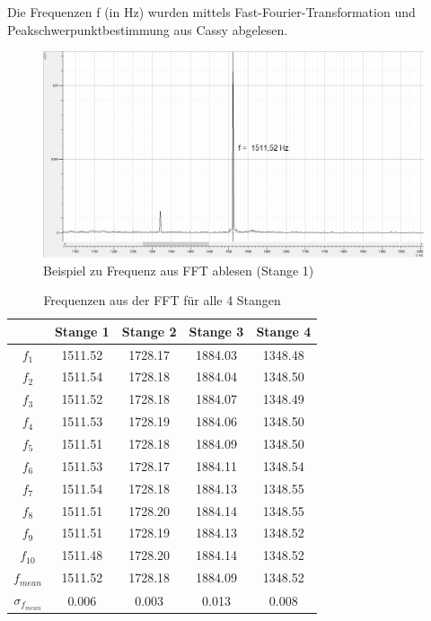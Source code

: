 \documentclass[12pt,a4paper]{article}
\begin{document}
Die Frequenzen f (in Hz) wurden mittels Fast-Fourier-Transformation und Peakschwerpunktbestimmung aus Cassy abgelesen.

\begin{figure}[H]
\centering
\includegraphics[scale=0.43]{Bilder/Beispiel_Cassy_Cu.png}
\caption{Beispiel zu Frequenz aus FFT ablesen (Stange 1)}
\end{figure}

\begin{table}[H]\centering
\caption{Frequenzen aus der FFT für alle 4 Stangen}
\begin{tabular}{c|cccc}
 & Stange 1 & Stange 2 & Stange 3 & Stange 4 \\ 
 \hline
$f_1$ & 1511.52 & 1728.17 & 1884.03 & 1348.48 \\ 
$f_2$ & 1511.54 & 1728.18 & 1884.04 & 1348.50 \\ 
$f_3$ & 1511.52 & 1728.18 & 1884.07 & 1348.49 \\ 
$f_4$ & 1511.53 & 1728.19 & 1884.06 & 1348.50 \\ 
$f_5$ & 1511.51 & 1728.18 & 1884.09 & 1348.50 \\ 
$f_6$ & 1511.53 & 1728.17 & 1884.11 & 1348.54 \\ 
$f_7$ & 1511.54 & 1728.18 & 1884.13 & 1348.55 \\ 
$f_8$ & 1511.51 & 1728.20 & 1884.14 & 1348.55 \\ 
$f_9$ & 1511.51 & 1728.19 & 1884.13 & 1348.52 \\ 
$f_{10}$ & 1511.48 & 1728.20 & 1884.14 & 1348.52 \\
\hline 
$f_{mean}$ & 1511.52 & 1728.18 &  1884.09 & 1348.52 \\ 
$\sigma_{f_{mean}}$ & 0.006 & 0.003 & 0.013 & 0.008 \\ 
\end{tabular} 
\end{table}
\end{document}
